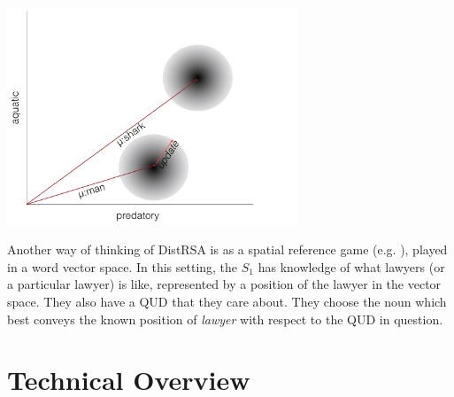 \documentclass[10pt,letterpaper,twocolumn]{article}
\begin{document}


\includegraphics[height=6.5cm]{diagram1.pdf}
   







Another way of thinking of DistRSA is as a spatial reference game (e.g. \cite{golland2010game}), played in a word vector space. In this setting, the $S_1$ has knowledge of what lawyers (or a particular lawyer) is like, represented by a position of the lawyer in the vector space. They also have a QUD that they care about. They choose the noun which best conveys the known position of \emph{lawyer} with respect to the QUD in question.









\section{Technical Overview} \label{technicaloverview}
\end{document}
